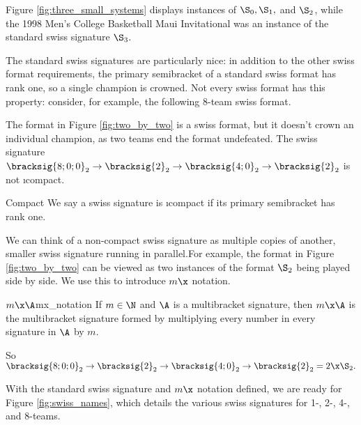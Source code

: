 {Figure \ref{fig:three_small_systems} displays instances of $\S_0, \S_1,$ and $\S_2$, while the 1998 Men's College Basketball Maui Invitational was an instance of the standard swiss signature $\S_3.$


    The standard swiss signatures are particularly nice: in addition to the other swiss format requirements, the primary semibracket of a standard swiss format has rank one, so a single champion is crowned. Not every swiss format has this property: consider, for example, the following 8-team swiss format.


    The format in Figure \ref{fig:two_by_two} is a swiss format, but it doesn't crown an individual champion, as two teams end the format undefeated. The swiss signature $\bracksig{8;0;0}_2 \to \bracksig{2}_2 \to \bracksig{4;0}_2 \to \bracksig{2}_2$ is not \i{compact}.

   \begin{definition}{Compact}{}
        We say a swiss signature is \i{compact} if its primary semibracket has rank one.
   \end{definition}

    We can think of a non-compact swiss signature as multiple copies of another, smaller swiss signature running in parallel.For example, the format in Figure \ref{fig:two_by_two} can be viewed as two instances of the format $\S_2$ being played side by side. We use this to introduce $m\x$ notation.  %

   \begin{definition}{$m\x\A$}{mx_notation}
        If $m \in \N$ and $\A$ is a multibracket signature, then $m\x\A$ is the multibracket signature formed by multiplying every number in every signature in $\A$ by $m$.
    \end{definition}

    So $\bracksig{8;0;0}_2 \to \bracksig{2}_2 \to \bracksig{4;0}_2 \to \bracksig{2}_2 = 2\x\S_2.$

    With the standard swiss signature and $m\x$ notation defined, we are ready for Figure \ref{fig:swiss_names}, which details the various swiss signatures for 1-, 2-, 4-, and 8-teams.

}

